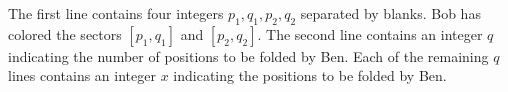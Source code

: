 The first line contains four integers $p_1,q_1,p_2,q_2$ separated by blanks.
Bob has colored the sectors $[p_1,q_1]$ and $[p_2,q_2]$.
The second line contains an integer $q$ indicating the number of positions
to be folded by Ben.
Each of the remaining $q$ lines contains an integer $x$ indicating 
the positions to be folded by Ben.
